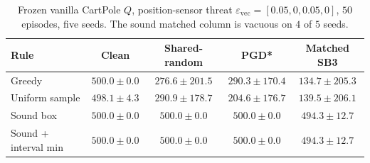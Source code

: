 \documentclass[10pt,twocolumn]{article}
\begin{document}
\begin{table}[t]
\centering
\small
\caption{Frozen vanilla CartPole $Q$, position-sensor threat $\varepsilon_{\mathrm{vec}}=[0.05,0,0.05,0]$, $50$ episodes, five seeds.
The sound matched column is vacuous on $4$ of $5$ seeds.}
\label{tab:cp-pos}
\setlength{\tabcolsep}{5pt}
\begin{tabular}{@{}lcccc@{}}
\toprule
Rule & Clean & Shared-random & PGD* & Matched SB3 \\
\midrule
Greedy & $500.0{\pm}0.0$ & $276.6{\pm}201.5$ & $290.3{\pm}170.4$ & $134.7{\pm}205.3$ \\
Uniform sample & $498.1{\pm}4.3$ & $290.9{\pm}178.7$ & $204.6{\pm}176.7$ & $139.5{\pm}206.1$ \\
Sound box & $500.0{\pm}0.0$ & $500.0{\pm}0.0$ & $500.0{\pm}0.0$ & $494.3{\pm}12.7$ \\
Sound + interval min & $500.0{\pm}0.0$ & $500.0{\pm}0.0$ & $500.0{\pm}0.0$ & $494.3{\pm}12.7$ \\
\bottomrule
\end{tabular}
\end{table}
\end{document}
